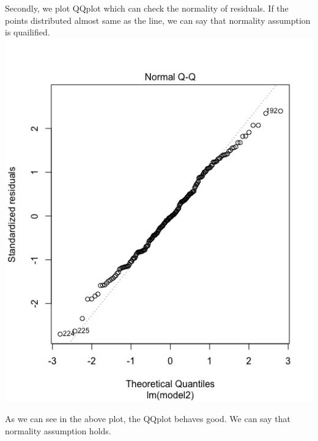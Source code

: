 \documentclass[letterpaper,10pt]{article}
\begin{document}
Secondly, we plot QQplot which can check the normality of residuals. If the points distributed almost same as the line, we can say that normality assumption is quailified.
\includegraphics[scale=0.6]{normality.jpeg}

As we can see in the above plot, the QQplot behaves good. We can say that normality assumption holds.
\end{document}
